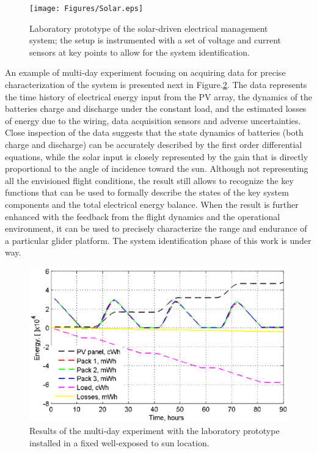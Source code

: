 \documentclass{ifacconf}
\begin{document}
\begin{figure}[thpb]
  \centering
  \texttt{[image: Figures/Solar.eps]}
  \caption{Laboratory prototype of the solar-driven electrical management system; the setup is
  instrumented with a set of voltage and current sensors at key points to allow for the system identification.}
  \label{fig:Solar_arch}
\end{figure}

An example of multi-day experiment focusing on acquiring data for precise
characterization of the system is presented next in
Figure.\ref{fig:MultiDay_enrg}. The data represents the time history of
electrical energy input from the PV array, the dynamics of the batteries
charge and discharge under the constant load, and the estimated losses of
energy due to the wiring, data acquisition sensors and adverse uncertainties.
Close inspection of the data suggests that the state dynamics of batteries
(both charge and discharge) can be accurately described by the first order
differential equations, while the solar input is closely represented by the
gain that is directly proportional to the angle of incidence toward the sun.
Although not representing all the envisioned flight conditions, the result
still allows to recognize the key functions that can be used to formally
describe the states of the key system components and the total electrical
energy balance. When the result is further enhanced with the feedback from
the flight dynamics and the operational environment, it can be used to
precisely characterize the range and endurance of a particular glider
platform. The system identification phase of this work is under way.
\begin{figure}[thpb]
  \centering
  \includegraphics[scale=0.61]{Figures/MultiDay_energy.eps}
  \caption{Results of the multi-day experiment with the laboratory prototype
  installed in a fixed well-exposed to sun location.}
  \label{fig:MultiDay_enrg}
\end{figure}
\end{document}
